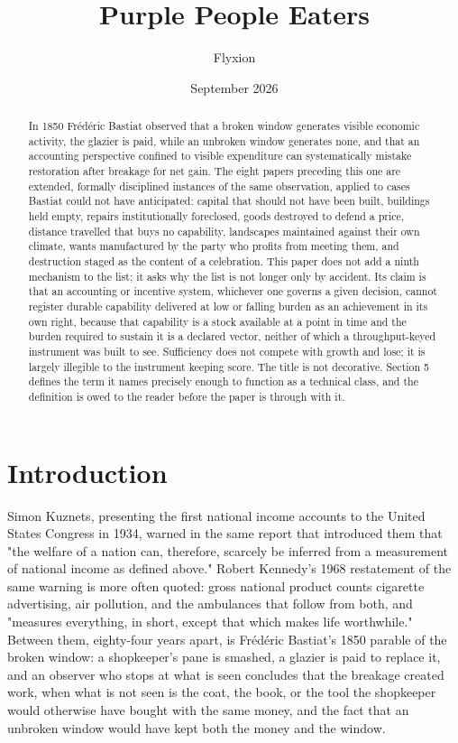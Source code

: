 \documentclass[11pt]{article}
\title{Purple People Eaters}
\author{Flyxion}
\affil{Independent Researcher}
\date{September 2026}
\begin{document}
\maketitle

\begin{abstract}
In 1850 Fr\'ed\'eric Bastiat observed that a broken window generates visible economic activity, the glazier is paid, while an unbroken window generates none, and that an accounting perspective confined to visible expenditure can systematically mistake restoration after breakage for net gain. The eight papers preceding this one are extended, formally disciplined instances of the same observation, applied to cases Bastiat could not have anticipated: capital that should not have been built, buildings held empty, repairs institutionally foreclosed, goods destroyed to defend a price, distance travelled that buys no capability, landscapes maintained against their own climate, wants manufactured by the party who profits from meeting them, and destruction staged as the content of a celebration. This paper does not add a ninth mechanism to the list; it asks why the list is not longer only by accident. Its claim is that an accounting or incentive system, whichever one governs a given decision, cannot register durable capability delivered at low or falling burden as an achievement in its own right, because that capability is a stock available at a point in time and the burden required to sustain it is a declared vector, neither of which a throughput-keyed instrument was built to see. Sufficiency does not compete with growth and lose; it is largely illegible to the instrument keeping score. The title is not decorative. Section 5 defines the term it names precisely enough to function as a technical class, and the definition is owed to the reader before the paper is through with it.
\end{abstract}

\section{Introduction}

Simon Kuznets, presenting the first national income accounts to the United States Congress in 1934, warned in the same report that introduced them that "the welfare of a nation can, therefore, scarcely be inferred from a measurement of national income as defined above." Robert Kennedy's 1968 restatement of the same warning is more often quoted: gross national product counts cigarette advertising, air pollution, and the ambulances that follow from both, and "measures everything, in short, except that which makes life worthwhile." Between them, eighty-four years apart, is Fr\'ed\'eric Bastiat's 1850 parable of the broken window: a shopkeeper's pane is smashed, a glazier is paid to replace it, and an observer who stops at what is seen concludes that the breakage created work, when what is not seen is the coat, the book, or the tool the shopkeeper would otherwise have bought with the same money, and the fact that an unbroken window would have kept both the money and the window.
\end{document}
